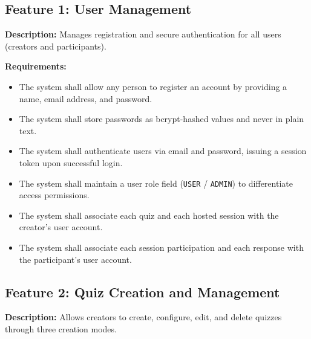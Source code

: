 \documentclass[12pt,a4paper]{article}
\begin{document}
\subsection{Feature 1: User Management}
\textbf{Description:} Manages registration and secure authentication for all users
(creators and participants).

\textbf{Requirements:}
\begin{itemize}
  \item[\textbf{FR1:}] The system shall allow any person to register an account by
        providing a name, email address, and password.
  \item[\textbf{FR2:}] The system shall store passwords as bcrypt-hashed values and
        never in plain text.
  \item[\textbf{FR3:}] The system shall authenticate users via email and password,
        issuing a session token upon successful login.
  \item[\textbf{FR4:}] The system shall maintain a user role field (\texttt{USER} /
        \texttt{ADMIN}) to differentiate access permissions.
  \item[\textbf{FR5:}] The system shall associate each quiz and each hosted session
        with the creator's user account.
  \item[\textbf{FR6:}] The system shall associate each session participation and each
        response with the participant's user account.
\end{itemize}

\subsection{Feature 2: Quiz Creation and Management}
\textbf{Description:} Allows creators to create, configure, edit, and delete quizzes
through three creation modes.
\end{document}
